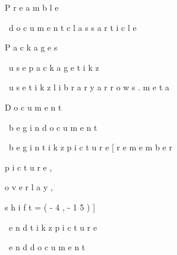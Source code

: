 	
%	
 	
P	
r	
e	
a	
m	
b	
l	
e	

	
\	
d	
o	
c	
u	
m	
e	
n	
t	
c	
l	
a	
s	
s	
{	
a	
r	
t	
i	
c	
l	
e	
}	

	

	
%	
 	
P	
a	
c	
k	
a	
g	
e	
s	

	
\	
u	
s	
e	
p	
a	
c	
k	
a	
g	
e	
{	
t	
i	
k	
z	
}	

	
\	
u	
s	
e	
t	
i	
k	
z	
l	
i	
b	
r	
a	
r	
y	
{	
a	
r	
r	
o	
w	
s	
.	
m	
e	
t	
a	
}	

	

	
%	
 	
D	
o	
c	
u	
m	
e	
n	
t	

	
\	
b	
e	
g	
i	
n	
{	
d	
o	
c	
u	
m	
e	
n	
t	
}	

	
 	
 	
 	
 	
\	
b	
e	
g	
i	
n	
{	
t	
i	
k	
z	
p	
i	
c	
t	
u	
r	
e	
}	
[	
r	
e	
m	
e	
m	
b	
e	
r	
 	
p	
i	
c	
t	
u	
r	
e	
,	
 	
o	
v	
e	
r	
l	
a	
y	
,	
 	
s	
h	
i	
f	
t	
=	
{	
(	
-	
4	
,	
-	
1	
5	
)	
}	
]	

	
 	
 	
 	
 	
\	
e	
n	
d	
{	
t	
i	
k	
z	
p	
i	
c	
t	
u	
r	
e	
}	

	
\	
e	
n	
d	
{	
d	
o	
c	
u	
m	
e	
n	
t	
}	

	
